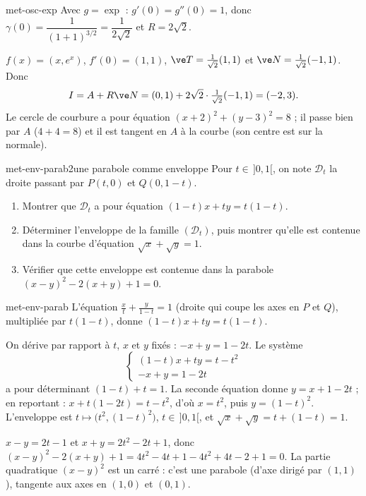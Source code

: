 \begin{corrige}{met-osc-exp}
 Avec $g=\exp$ : $g'(0)=g''(0)=1$, donc $\gamma(0)=\dfrac{1}{(1+1)^{3/2}}=\dfrac1{2\sqrt2}$ et $R=2\sqrt2$.

 $f(x)=(x,e^x)$, $f'(0)=(1,1)$, $\ve T=\frac1{\sqrt2}(1,1)$ et $\ve N=\frac1{\sqrt2}(-1,1)$. Donc
\[I=A+R\ve N=(0,1)+2\sqrt2\cdot\tfrac1{\sqrt2}(-1,1)=(-2,3).\]
Le cercle de courbure a pour équation $(x+2)^2+(y-3)^2=8$ ; il passe bien par $A$ ($4+4=8$) et il est tangent en $A$ à la courbe (son centre est sur la normale).
\end{corrige}

\begin{exo}{met-env-parab}{2}{une parabole comme enveloppe}
Pour $t\in\,]0,1[$, on note $\mathcal D_t$ la droite passant par $P(t,0)$ et $Q(0,1-t)$.
\begin{enumerate}
\item Montrer que $\mathcal D_t$ a pour équation $(1-t)x+ty=t(1-t)$.
\item Déterminer l'enveloppe de la famille $(\mathcal D_t)$, puis montrer qu'elle est contenue dans la courbe d'équation $\sqrt x+\sqrt y=1$.
\item Vérifier que cette enveloppe est contenue dans la parabole $(x-y)^2-2(x+y)+1=0$.
\end{enumerate}
\end{exo}

\begin{corrige}{met-env-parab}
 L'équation $\frac xt+\frac y{1-t}=1$ (droite qui coupe les axes en $P$ et $Q$), multipliée par $t(1-t)$, donne $(1-t)x+ty=t(1-t)$.

 On dérive par rapport à $t$, $x$ et $y$ fixés : $-x+y=1-2t$. Le système
\[\begin{cases}(1-t)x+ty=t-t^2\\-x+y=1-2t\end{cases}\]
a pour déterminant $(1-t)+t=1$. La seconde équation donne $y=x+1-2t$ ; en reportant : $x+t(1-2t)=t-t^2$, d'où $x=t^2$, puis $y=(1-t)^2$. L'enveloppe est $t\mapsto\big(t^2,(1-t)^2\big)$, $t\in\,]0,1[$, et $\sqrt x+\sqrt y=t+(1-t)=1$.

 $x-y=2t-1$ et $x+y=2t^2-2t+1$, donc $(x-y)^2-2(x+y)+1=4t^2-4t+1-4t^2+4t-2+1=0$. La partie quadratique $(x-y)^2$ est un carré : c'est une parabole (d'axe dirigé par $(1,1)$), tangente aux axes en $(1,0)$ et $(0,1)$.
\end{corrige}

